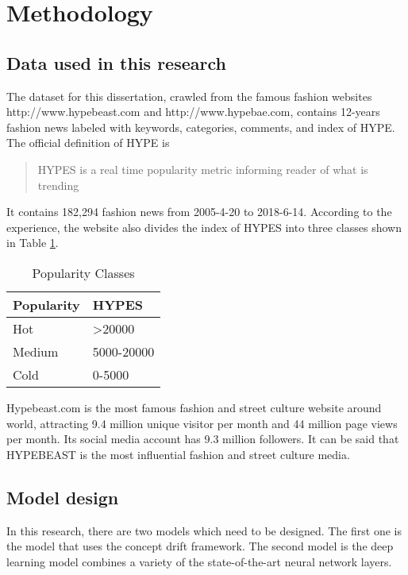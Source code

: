 \section{Methodology}
\subsection{Data used in this research}
The dataset for this dissertation, crawled from the famous fashion websites http://www.hypebeast.com and http://www.hypebae.com, contains 12-years fashion news labeled with keywords, categories, comments, and index of HYPE. The official definition of HYPE is 

\begin{quote}
HYPES is a real time popularity metric informing reader of what is trending
\end{quote}

It contains 182,294 fashion news from 2005-4-20 to 2018-6-14. According to the experience, the website also divides the index of HYPES into three classes shown in Table \ref{popularityclasses}.

\begin{table}[]
\centering
\caption{Popularity Classes}
\label{popularityclasses}
\begin{tabular}{ll}
\hline
Popularity & HYPES               \\ \hline
Hot        & \textgreater{}20000 \\
Medium     & 5000-20000          \\
Cold       & 0-5000 \\
\hline             
\end{tabular}
\end{table}

Hypebeast.com is the most famous fashion and street culture website around world, attracting 9.4 million unique visitor per month and 44 million page views per month. Its social media account has 9.3 million followers. It can be said that HYPEBEAST is the most influential fashion and street culture media.


\subsection{Model design}
In this research, there are two models which need to be designed. The first one is the model that uses the concept drift framework. The second model is the deep learning model combines a variety of the state-of-the-art neural network layers.

